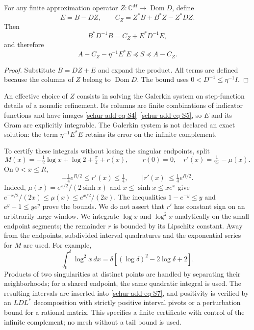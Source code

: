 \begin{theorem}
\label{schur-add-residual}
For any finite
approximation operator \(Z:\mathbb C^M\to\operatorname{Dom}D\), define
\begin{equation}
E=B-DZ,\qquad C_Z=Z^*B+B^*Z-Z^*DZ.
\label{schur-add-display-15}
\end{equation}
Then
\begin{equation}
B^*D^{-1}B=C_Z+E^*D^{-1}E,
\label{schur-add-display-16}
\end{equation}
and therefore
\begin{equation}
\boxed{A-C_Z-\eta^{-1}E^*E\preceq S\preceq A-C_Z.}
\label{schur-add-eq-S7}
\end{equation}
\end{theorem}
\begin{proof}
Substitute \(B=DZ+E\) and expand the product. All
terms are defined because the columns of \(Z\) belong to
\(\operatorname{Dom}D\). The bound uses \(0<D^{-1}\leq\eta^{-1}I\).
\end{proof}

An effective choice of \(Z\) consists in solving the
Galerkin system on step-function details of a nonadic refinement. Its
columns are finite combinations of indicator functions and have images
\eqref{schur-add-eq-S4}--\eqref{schur-add-eq-S5}, so \(E\) and its Gram are explicitly integrable. The
Galerkin system is not declared an exact solution: the term
\(\eta^{-1}E^*E\) retains its error on the infinite complement.

To certify these integrals without losing the singular endpoints,
split
\begin{equation}
M(x)=-\tfrac12\log x+\log2+\tfrac\pi4+r(x),
\qquad r(0)=0,\quad r'(x)=\tfrac1{2x}-\mu(x).
\label{schur-add-eq-S8}
\end{equation}
On \(0<x\leq R\),
\begin{equation}
-\tfrac14 e^{R/2}\leq r'(x)\leq\tfrac14,
\qquad |r'(x)|\leq\tfrac14e^{R/2}.
\label{schur-add-display-19}
\end{equation}
Indeed, \(\mu(x)=e^{x/2}/(2\sinh x)\) and
\(x\leq\sinh x\leq xe^x\) give
\(e^{-x/2}/(2x)\leq\mu(x)\leq e^{x/2}/(2x)\).
The inequalities \(1-e^{-y}\leq y\) and \(e^y-1\leq ye^y\)
prove the bounds. We do not assert that \(r'\) has constant sign
on an arbitrarily large window.
We integrate \(\log x\) and \(\log^2x\) analytically on the small
endpoint segments; the remainder \(r\) is bounded by its Lipschitz constant.
Away from the endpoints, subdivided interval quadratures and
the exponential series for \(M\) are used. For example,
\begin{equation}
\int_0^\delta\log^2x\,dx
=\delta[(\log\delta)^2-2\log\delta+2].
\label{schur-add-display-20}
\end{equation}
Products of two singularities at distinct points are handled
by separating their neighborhoods; for a shared endpoint, the same
quadratic integral is used. The resulting intervals are inserted into \eqref{schur-add-eq-S7}, and
positivity is verified by an \(LDL^*\) decomposition with
strictly positive interval pivots or a perturbation bound
for a rational matrix. This specifies a finite certificate
with control of the infinite complement; no mesh without a tail bound is used.

